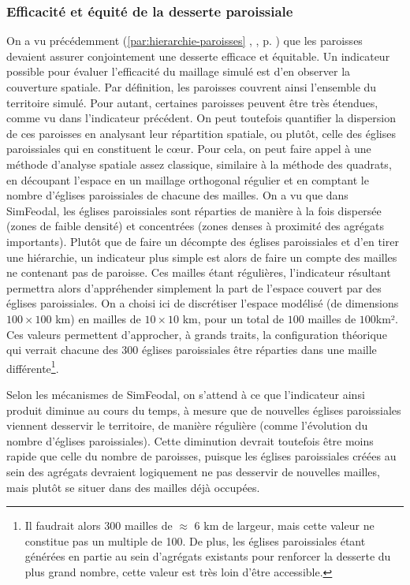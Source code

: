 \clearpage

\subsubsection{Efficacité et équité de la desserte paroissiale}

On a vu précédemment (\ref{par:hierarchie-paroisses} , , p. \pageref{par:hierarchie-paroisses}) que les paroisses devaient assurer conjointement une desserte efficace et équitable.
Un indicateur possible pour évaluer l'efficacité du maillage simulé est d'en observer la couverture spatiale.
Par définition, les paroisses couvrent ainsi l'ensemble du territoire simulé.
Pour autant, certaines paroisses peuvent être très étendues, comme vu dans l'indicateur précédent.
On peut toutefois quantifier la dispersion de ces paroisses en analysant leur répartition spatiale, ou plutôt, celle des églises paroissiales qui en constituent le cœur.
Pour cela, on peut faire appel à une méthode d'analyse spatiale assez classique, similaire à la méthode des quadrats, en découpant l'espace en un maillage orthogonal régulier et en comptant le nombre d'églises paroissiales de chacune des mailles.
On a vu que dans SimFeodal, les églises paroissiales sont réparties de manière à la fois dispersée (zones de faible densité) et concentrées (zones denses à proximité des agrégats importants).
Plutôt que de faire un décompte des églises paroissiales et d'en tirer une hiérarchie, un indicateur plus simple est alors de faire un compte des mailles ne contenant pas de paroisse. Ces mailles étant régulières, l'indicateur résultant permettra alors d'appréhender simplement la part de l'espace couvert par des églises paroissiales.
On a choisi ici de discrétiser l'espace modélisé (de dimensions $100\times100$ km) en mailles de $10\times10$ km, pour un total de $100$ mailles de $100$km².
Ces valeurs permettent d'approcher, à grands traits, la configuration théorique qui verrait chacune des 300 églises paroissiales être réparties dans une maille différente\footnote{Il faudrait alors 300 mailles de $\approx$ 6 km de largeur, mais cette valeur ne constitue pas un multiple de 100. De plus, les églises paroissiales étant générées en partie au sein d'agrégats existants pour renforcer la desserte du plus grand nombre, cette valeur est très loin d'être accessible.}.

Selon les mécanismes de SimFeodal, on s'attend à ce que l'indicateur ainsi produit diminue au cours du temps, à mesure que de nouvelles églises paroissiales viennent desservir le territoire, de manière régulière (comme l'évolution du nombre d'églises paroissiales).
Cette diminution devrait toutefois être moins rapide que celle du nombre de paroisses, puisque les églises paroissiales créées au sein des agrégats devraient logiquement ne pas desservir de nouvelles mailles, mais plutôt se situer dans des mailles déjà occupées.


